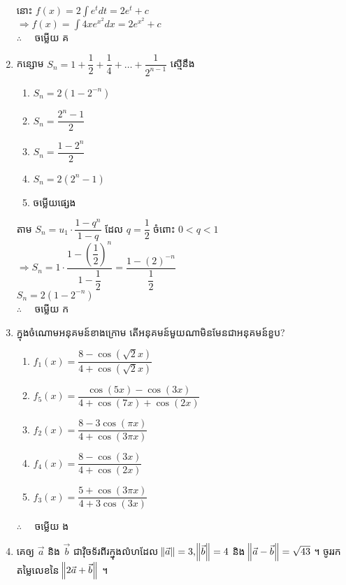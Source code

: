 \documentclass[a4paper,12pt]{article}
\begin{document}
\begin{enumerate}[m]
\begin{center}
			 នោះ $f(x)=2\int e^{t}dt=2e^t+c$\\
			 $\Rightarrow f(x)=\int4xe^{x^2}dx=2e^{x^2}+c$\\
			 $\therefore \quad$ \kml ចម្លើយ \kbk  គ
		\end{center}
	{\color{blue}\hrulefill}
	\item កន្សោម $S_n=1+\dfrac{1}{2}+\dfrac{1}{4}+\dots+\dfrac{1}{2^{n-1}}$ ស្មើនឹង
		\begin{enumerate}[k,3]
			\item $S_n=2\left(1-2^{-n}\right)$
			\item $S_n=\dfrac{2^n-1}{2}$
			\item $S_n=\dfrac{1-2^n}{2}$
			\item $S_n=2\left(2^n-1\right)$
			\item ចម្លើយផ្សេង
		\end{enumerate}
		\answer
		\begin{center}
			តាម $S_n=u_1\cdot\dfrac{1-q^n}{1-q}$ ដែល $q=\dfrac{1}{2}$ ចំពោះ $0<q<1$\\
			$\Rightarrow S_n=1\cdot\dfrac{1-\left(\dfrac{1}{2}\right)^n}{1-\dfrac{1}{2}}=\dfrac{1-\left(2\right)^{-n}}{\dfrac{1}{2}}$\\
			$S_n=2\left(1-2^{-n}\right)$\\
			$\therefore \quad$ \kml ចម្លើយ \kbk ក
		\end{center}
	{\color{blue}\hrulefill}
	\item ក្នុងចំណោមអនុគមន៍ខាងក្រោម តើអនុគមន៍មួយណាមិនមែនជាអនុគមន៍ខួប?
	\begin{enumerate}[k,3]
		\item $f_1(x)=\dfrac{8-\cos\left(\sqrt{2}x\right)}{4+\cos\left(\sqrt{2}x\right)}$
		\item $f_5(x)=\dfrac{\cos\left(5x\right)-\cos\left(3x\right)}{4+\cos\left(7x\right)+\cos\left(2x\right)}$
		\item $f_2(x)=\dfrac{8-3\cos\left(\pi x\right)}{4+\cos\left(3\pi x\right)}$
		\item $f_4(x)=\dfrac{8-\cos\left(3x\right)}{4+\cos\left(2x\right)}$
		\item $f_3(x)=\dfrac{5+\cos\left(3\pi x\right)}{4+3\cos\left(3x\right)}$
	\end{enumerate}
	\answer
	\begin{center}
		$\therefore \quad$ \kml ចម្លើយ \kbk ង
	\end{center}
	{\color{blue}\hrulefill}
	\item គេឲ្យ $\vec{a}$ និង $\vec{b}$ ជាវ៉ិចទ័រពីរក្នុងលំហដែល $\norm{\vec{a}}=3, \norm{\vec{b}}=4$ និង $\norm{\vec{a}-\vec{b}}=\sqrt{43}$ ។ ចូររកតម្លៃលេខនៃ $\norm{2\vec{a}+\vec{b}}$ ។

\end{enumerate}
\end{document}
